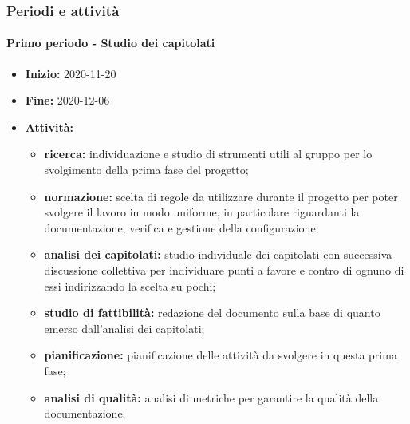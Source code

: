 \subsubsection{Periodi e attività}

\paragraph[Primo periodo]{Primo periodo - \textnormal{Studio dei capitolati}}
\begin{itemize}
    \item [] \textbf{Inizio:} 2020-11-20
    \item [] \textbf{Fine:} 2020-12-06
    \item [] \textbf{Attività:}
          \begin{itemize}
              \item \textbf{ricerca:} individuazione e studio di strumenti utili al gruppo per lo svolgimento della prima fase del progetto;
              \item \textbf{normazione:} scelta di regole da utilizzare durante il progetto per poter svolgere il lavoro in modo uniforme, in particolare riguardanti la documentazione, verifica e gestione della configurazione;
              \item \textbf{analisi dei capitolati:} studio individuale dei capitolati con successiva discussione collettiva per individuare punti a favore e contro di ognuno di essi indirizzando la scelta su pochi;
              \item \textbf{studio di fattibilità:} redazione del documento sulla base di quanto emerso dall'analisi dei capitolati;
              \item \textbf{pianificazione:} pianificazione delle attività da svolgere in questa prima fase;
              \item \textbf{analisi di qualità:} analisi di metriche per garantire la qualità della documentazione.
          \end{itemize}
\end{itemize}

